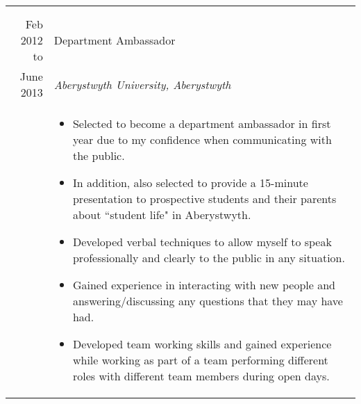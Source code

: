 \documentclass[a4paper, 10pt]{extarticle} %
\begin{document}
\begin{longtable}{r | p{13cm}}
{\begin{itemize}[leftmargin=*]
\end{itemize}

}

\\

\multicolumn{2}{c}{} \\

		Feb 2012 to
		
		 & 
		 
		 Department Ambassador  \\
		 
			June 2013
		 
		& 
		 
		\textit{Aberystwyth University, Aberystwyth} \\ 
		
& 

\footnotesize{

\vspace{-0.3cm}

\begin{itemize}[leftmargin=*]
\item Selected to become a department ambassador in first year due to my confidence when communicating with the public.

\item In addition, also selected to provide a 15-minute presentation to prospective students and their parents about ``student life" in Aberystwyth. 

\item Developed verbal techniques to allow myself to speak professionally and clearly to the public in any situation.

\item Gained experience in interacting with new people and answering/discussing any questions that they may have had. 

\item Developed team working skills and gained experience while working as part of a team performing different roles with different team members during open days.

\vspace{-0.3cm}

\end{itemize}

}

\end{longtable}

\end{document}
